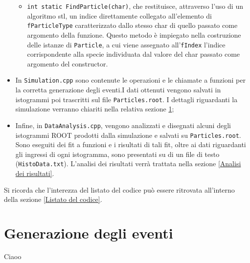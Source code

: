 \documentclass{article}
\begin{document}
\begin{itemize}
\begin{itemize}
        \item \texttt{int static FindParticle(char)}, che restituisce, attraverso l'uso di un algoritmo stl, un indice direttamente collegato all'elemento di \texttt{fParticleType} caratterizzato dallo stesso char di quello passato come argomento della funzione. Questo metodo è impiegato nella costruzione delle istanze di \texttt{Particle}, a cui viene assegnato all'\texttt{fIndex} l'indice corrispondente alla specie individuata dal valore del char passato come argomento del constructor.
    \end{itemize}
    \item In \texttt{Simulation.cpp} sono contenute le operazioni e le chiamate a funzioni per la corretta generazione degli eventi.I dati ottenuti vengono salvati in istogrammi poi trascritti sul file \texttt{Particles.root}. I dettagli riguardanti la simulazione verranno chiariti nella relativa sezione \ref{Generazione degli eventi};
    \item Infine, in \texttt{DataAnalysis.cpp}, vengono analizzati e disegnati alcuni degli istogrammi ROOT prodotti dalla simulazione e salvati su \texttt{Particles.root}. Sono eseguiti dei fit a funzioni e i risultati di tali fit, oltre ai dati riguardanti gli ingressi di ogni istogramma, sono presentati su di un file di testo (\texttt{HistoData.txt}). L'analisi dei risultati verrà trattata nella sezione \ref{Analisi dei risultati}.
\end{itemize}
Si ricorda che l'interezza del listato del codice può essere ritrovata all'interno della sezione \ref{Listato del codice}.
\section{Generazione degli eventi}
\label{Generazione degli eventi}
Ciaoo
\end{document}
